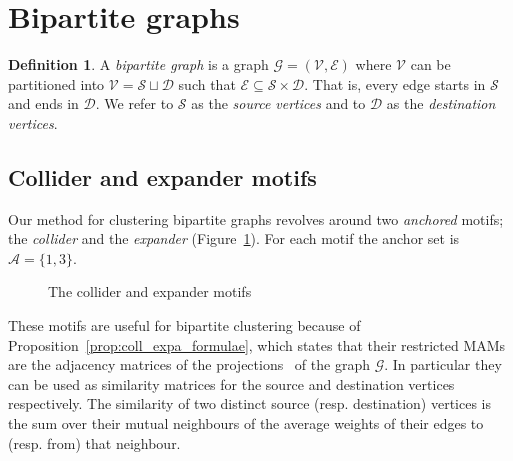 \documentclass[12pt,draft]{ociamthesis}
\theoremstyle{plain}
\theoremstyle{definition}
\newtheorem{definition}{Definition}[chapter]
\theoremstyle{remark}
\newcommand\ca[1]{\mathcal{#1}}
\begin{document}
\section{Bipartite graphs} \label{sec:bipartite_graphs}

\begin{definition}
  A \emph{bipartite graph} is a graph $\ca{G}=(\ca{V,E})$ where $\ca{V}$ can be
  partitioned into $\ca{V} = \ca{S} \sqcup \ca{D}$ such that $\ca{E} \subseteq
  \ca{S} \times \ca{D}$. That is, every edge starts in $\ca{S}$ and ends in
  $\ca{D}$. We refer to $\ca{S}$ as the \emph{source vertices} and to $\ca{D}$
  as the \emph{destination vertices}.
\end{definition}

\subsection{Collider and expander motifs} \label{sec:coll_expa}

Our method for clustering bipartite graphs revolves around two \emph{anchored}
motifs; the \emph{collider} and the \emph{expander}
(Figure~\ref{fig:expa_coll}). For each motif the anchor set is $\ca{A}=\{ 1,3
\}$.

\begin{figure}[H]
  \centering
  \caption{The collider and expander motifs}
  \label{fig:expa_coll}
\end{figure}

These motifs are useful for bipartite clustering because of
Proposition~\ref{prop:coll_expa_formulae}, which states that their restricted
MAMs are the adjacency matrices of the
projections~\cite{kolaczyk2014statistical} of the graph $\ca{G}$.
In particular they can be used as similarity matrices for the source and
destination vertices respectively.
The similarity of two distinct source (resp. destination) vertices is the sum
over their mutual neighbours of the average weights of their edges to (resp.
from) that neighbour.
\end{document}
